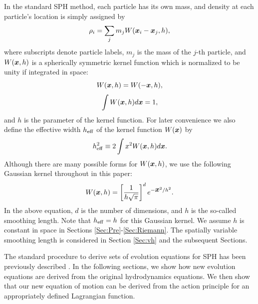 \documentclass{cjour}
\newcommand{ \Vec   }[1]{ \mbox{\boldmath $ #1 $} }
\begin{document}
\begin{article}
In the standard SPH method, 
each particle has its own mass, and density at each particle's 
location is simply assigned by 
\begin{equation}
                 \rho_{i} =
                 \sum_{j} m_{j} W(\Vec{x}_{i} - \Vec{x}_{j} , h ), 
\end{equation}
where subscripts denote particle labels, 
$m_{j}$ is the mass of the $j$-th particle, 
and $W(\Vec{x},h)$ is a spherically symmetric kernel function 
which is normalized to be unity if integrated in space: 
\begin{equation}
                      W(\Vec{x},h) = W(-\Vec{x},h) , 
                                                  \label{eq:symm}
\end{equation}
\begin{equation}
                 \int W(\Vec{x},h) d\Vec{x} = 1 ,  
                                                  \label{eq:norm}
\end{equation}
and $h$ is the parameter of the kernel function. 
For later convenience we also define the effective width 
$h_{\rm eff}$ of the kernel function $W(\Vec{x})$ by 
\begin{equation}
                  h_{\rm eff}^2 \equiv 
                  2 \int x^2 W(\Vec{x},h) d\Vec{x} . 
                                                       \label{eq:heff}
\end{equation}
Although there are many possible forms for $W(\Vec{x},h)$, 
we use the following Gaussian kernel throughout in this paper: 
\begin{equation}
                 W(\Vec{x},h) =
                        \left[ \frac{1}{ h \sqrt{\pi} } \right]^{d}
                        e^{ - \Vec{x}^2 / h^2 } .
                                                  \label{eq:gaussian}
\end{equation}
In the above equation, $d$ is the number of dimensions, 
and $h$ is the so-called smoothing length. %
Note that $h_{\rm eff} = h$ for this Gaussian kernel. 
We assume $h$ is constant in space in Sections 
\ref{Sec:Pre}-\ref{Sec:Riemann}. 
The spatially variable smoothing length is considered
in Section \ref{Sec:vh} and the subsequent Sections.

The standard procedure to derive sets of evolution equations 
for SPH has been previously described \cite{Monaghan:ARAA}. 
In the following sections, we show how new evolution equations are 
derived from the original hydrodynamics equations.  
We then show that our new equation of motion can be derived from 
the action principle for an appropriately defined Lagrangian function. 


\end{article}
\end{document}
